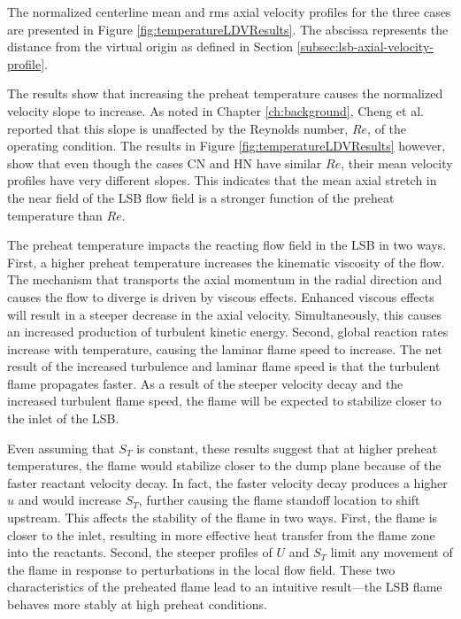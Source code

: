 

The normalized centerline mean and rms axial velocity profiles for the three cases are presented in Figure \ref{fig:temperatureLDVResults}.
The abscissa represents the distance from the virtual origin as defined in Section \ref{subsec:lsb-axial-velocity-profile}.



The results show that increasing the preheat temperature causes the normalized velocity slope to increase.
As noted in Chapter \ref{ch:background}, Cheng et al.\cite{2008-cheng-a} reported that this slope is unaffected by the Reynolds number, \(Re\), of the operating condition.
The results in Figure \ref{fig:temperatureLDVResults} however, show that even though the cases CN and HN have similar \(Re\), their mean velocity profiles have very different slopes.
This indicates that the mean axial stretch in the near field of the LSB flow field is a stronger function of the preheat temperature than \(Re\).


The preheat temperature impacts the reacting flow field in the LSB in two ways.
First, a higher preheat temperature increases the kinematic viscosity of the flow.
The mechanism that transports the axial momentum in the radial direction and causes the flow to diverge is driven by viscous effects.
Enhanced viscous effects will result in a steeper decrease in the axial velocity.
Simultaneously, this causes an increased production of turbulent kinetic energy.
Second, global reaction rates increase with temperature, causing the laminar flame speed to increase.
The net result of the increased turbulence and laminar flame speed is that the turbulent flame propagates faster.
As a result of the steeper velocity decay and the increased turbulent flame speed, the flame will be expected to stabilize closer to the inlet of the LSB.

Even assuming that \(S_T\) is constant, these results suggest that at higher preheat temperatures, the flame would stabilize closer to the dump plane because of the faster reactant velocity decay.
In fact, the faster velocity decay produces a higher \(u\) and would increase \(S_T\), further causing the flame standoff location to shift upstream.
This affects the stability of the flame in two ways.
First, the flame is closer to the inlet, resulting in more effective heat transfer from the flame zone into the reactants.
Second, the steeper profiles of \(U\) and \(S_T\) limit any movement of the flame in response to perturbations in the local flow field.
These two characteristics of the preheated flame lead to an intuitive result---the LSB flame behaves more stably at high preheat conditions.


